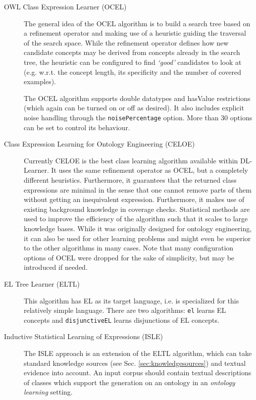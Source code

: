 \documentclass[a4paper,12pt]{scrartcl}
\begin{document}
\begin{description}
 \item[OWL Class Expression Learner (OCEL)]
 The general idea of the OCEL algorithm is to build a search tree based on a refinement operator and making use of a heuristic guiding the traversal of the search space.
 While the refinement operator defines how new candidate concepts may be derived from concepts already in the search tree, the heuristic can be configured to find \emph{`good'} candidates to look at (e.g. w.r.t. the concept length, its specificity and the number of covered examples).
 
 The OCEL algorithm supports double datatypes and hasValue restrictions (which again can be turned on or off as desired).
 It also includes explicit noise handling through the \verb|noisePercentage| option.
 More than 30 options can be set to control its behaviour.

 \item[Class Expression Learning for Ontology Engineering (CELOE)] Currently CELOE is the best class learning algorithm available within DL-Learner. It uses the same refinement operator as OCEL, but a completely different heuristics. Furthermore, it guarantees that the returned class expressions are minimal in the sense that one cannot remove parts of them without getting an inequivalent expression. Furthermore, it makes use of existing background knowledge in coverage checks. Statistical methods are used to improve the efficiency of the algorithm such that it scales to large knowledge bases. While it was originally designed for ontology engineering, it can also be used for other learning problems and might even be superior to the other algorithms in many cases. Note that many configuration options of OCEL were dropped for the sake of simplicity, but may be introduced if needed.
 \item[EL Tree Learner (ELTL)] This algorithm has EL as its target language, i.e. is specialized for this relatively simple language. There are two algorithms: \verb|el| learns EL concepts and \verb|disjunctiveEL| learns disjunctions of EL concepts.
 \item[Inductive Statistical Learning of Expressions (ISLE)]
 The ISLE approach \cite{Buehmann2014_short} is an extension of the ELTL algorithm, which can take standard knowledge sources (see Sec. \ref{sec:knowledgesources}) and textual evidence into account.
 An input corpus should contain textual descriptions of classes which support the generation on an ontology in an \emph{ontology learning} setting.
\end{description}
\end{document}
